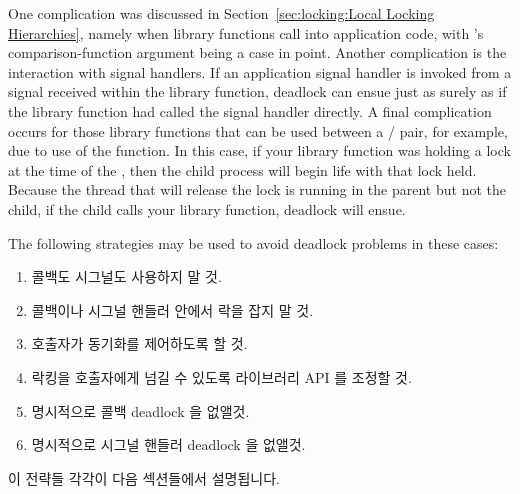 One complication was discussed in
Section~\ref{sec:locking:Local Locking Hierarchies}, namely
when library functions call into application code, with 's
comparison-function argument being a case in point.
Another complication is the interaction with signal handlers.
If an application signal handler is invoked from a signal received within
the library function, deadlock can ensue just as surely as
if the library function had called the signal handler directly.
A final complication occurs for those library functions that can be used
between a / pair, for example, due to use of
the  function.
In this case, if your library function was holding a lock at the time of
the , then the child process will begin life with that lock held.
Because the thread that will release the lock is running in the parent
but not the child, if the child calls your library function, deadlock
will ensue.

The following strategies may be used to avoid deadlock problems in these cases:
\fi

\begin{enumerate}
\item	콜백도 시그널도 사용하지 말 것.
\item	콜백이나 시그널 핸들러 안에서 락을 잡지 말 것.
\item	호출자가 동기화를 제어하도록 할 것.
\item	락킹을 호출자에게 넘길 수 있도록 라이브러리 API 를 조정할 것.
\item	명시적으로 콜백 deadlock 을 없앨것.
\item	명시적으로 시그널 핸들러 deadlock 을 없앨것.

\end{enumerate}

이 전략들 각각이 다음 섹션들에서 설명됩니다.

